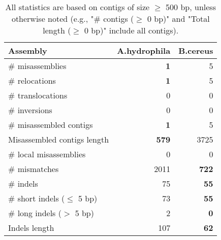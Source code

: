 \documentclass[12pt,a4paper]{article}
\begin{document}
\begin{table}[ht]
\begin{center}
\caption{All statistics are based on contigs of size $\geq$ 500 bp, unless otherwise noted (e.g., "\# contigs ($\geq$ 0 bp)" and "Total length ($\geq$ 0 bp)" include all contigs).}
\begin{tabular}{|l*{2}{|r}|}
\hline
Assembly & A.hydrophila & B.cereus \\ \hline
\# misassemblies & {\bf 1} & 5 \\ \hline
\hspace{5mm}\# relocations & {\bf 1} & 5 \\ \hline
\hspace{5mm}\# translocations & 0 & 0 \\ \hline
\hspace{5mm}\# inversions & 0 & 0 \\ \hline
\# misassembled contigs & {\bf 1} & 5 \\ \hline
Misassembled contigs length & {\bf 579} & 3725 \\ \hline
\# local misassemblies & 0 & 0 \\ \hline
\# mismatches & 2011 & {\bf 722} \\ \hline
\# indels & 75 & {\bf 55} \\ \hline
\hspace{5mm}\# short indels ($\leq$ 5 bp) & 73 & {\bf 55} \\ \hline
\hspace{5mm}\# long indels ($>$ 5 bp) & 2 & {\bf 0} \\ \hline
Indels length & 107 & {\bf 62} \\ \hline
\end{tabular}
\end{center}
\end{table}
\end{document}
